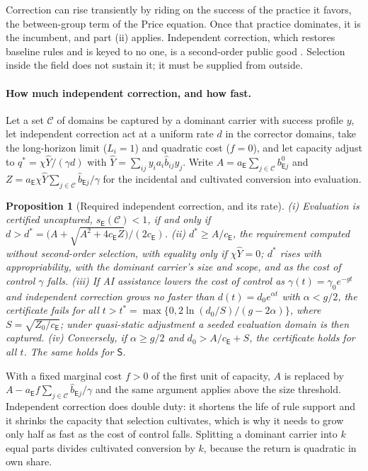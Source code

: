 \documentclass[letterpaper]{article} %
\newtheorem{proposition}{Proposition}
\theoremstyle{definition}
\newcommand{\dE}{\mathsf{E}}
\newcommand{\dS}{\mathsf{S}}
\newcommand{\cC}{\mathcal{C}}
\begin{document}
Correction can rise transiently by riding on the success of the practice it favors, the between-group term of the Price equation. Once that practice dominates, it is the incumbent, and part (ii) applies. Independent correction, which restores baseline rules and is keyed to no one, is a second-order public good \citep{oliver1980,yamagishi1986,heckathorn1989}. Selection inside the field does not sustain it; it must be supplied from outside.

\paragraph{How much independent correction, and how fast.} Let a set $\cC$ of domains be captured by a dominant carrier with success profile $y$, let independent correction act at a uniform rate $d$ in the corrector domains, take the long-horizon limit ($L_i=1$) and quadratic cost ($f=0$), and let capacity adjust to $q^\ast=\chi\hat Y/(\gamma d)$ with $\hat Y=\sum_{ij}y_ia_i\hat b_{ij}y_j$. Write $A=a_\dE\sum_{j\in\cC}b^0_{\dE j}$ and $Z=a_\dE\chi\hat Y\sum_{j\in\cC}\hat b_{\dE j}/\gamma$ for the incidental and cultivated conversion into evaluation.

\begin{proposition}[Required independent correction, and its rate]\label{prop:rate}
(i) Evaluation is certified uncaptured, $s_\dE(\cC)<1$, if and only if $d>d^\ast=\big(A+\sqrt{A^2+4c_\dE Z}\big)/(2c_\dE)$. (ii) $d^\ast\ge A/c_\dE$, the requirement computed without second-order selection, with equality only if $\chi\hat Y=0$; $d^\ast$ rises with appropriability, with the dominant carrier's size and scope, and as the cost of control $\gamma$ falls. (iii) If AI assistance lowers the cost of control as $\gamma(t)=\gamma_0e^{-gt}$ and independent correction grows no faster than $d(t)=d_0e^{\alpha t}$ with $\alpha<g/2$, the certificate fails for all $t>t^\ast=\max\{0,2\ln(d_0/S)/(g-2\alpha)\}$, where $S=\sqrt{Z_0/c_\dE}$; under quasi-static adjustment a seeded evaluation domain is then captured. (iv) Conversely, if $\alpha\ge g/2$ and $d_0>A/c_\dE+S$, the certificate holds for all $t$. The same holds for $\dS$.
\end{proposition}

With a fixed marginal cost $f>0$ of the first unit of capacity, $A$ is replaced by $A-a_\dE f\sum_{j\in\cC}\hat b_{\dE j}/\gamma$ and the same argument applies above the size threshold. Independent correction does double duty: it shortens the life of rule support and it shrinks the capacity that selection cultivates, which is why it needs to grow only half as fast as the cost of control falls. Splitting a dominant carrier into $k$ equal parts divides cultivated conversion by $k$, because the return is quadratic in own share.
\end{document}
